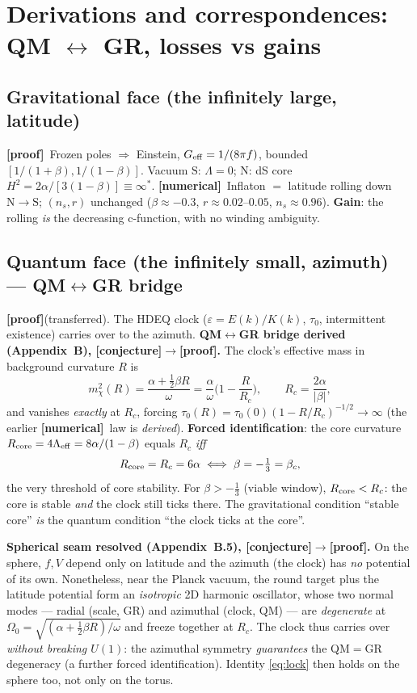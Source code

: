 \documentclass[11pt]{article}
\newcommand{\preuve}{{\small\textbf{[proof]}}}
\newcommand{\num}{{\small\textbf{[numerical]}}}
\newcommand{\conj}{{\small\textbf{[conjecture]}}}
\newcommand{\Spole}{\mathrm{S}}
\newcommand{\Npole}{\mathrm{N}}
\theoremstyle{definition}
\begin{document}
\section{Derivations and correspondences: QM $\leftrightarrow$ GR, losses vs gains}

\subsection{Gravitational face (the infinitely large, latitude)}
\preuve\ Frozen poles $\Rightarrow$ Einstein, $G_{\rm eff}=1/(8\pi f)$, bounded
$[1/(1+\beta),1/(1-\beta)]$. Vacuum $\Spole$: $\Lambda=0$; $\Npole$: dS core
$H^2=2\alpha/[3(1-\beta)]\equiv\infty^\ast$. \num\ Inflaton $=$ latitude rolling down $\Npole\!\to\!\Spole$;
$(n_s,r)$ unchanged ($\beta\approx-0.3$, $r\approx0.02$--$0.05$, $n_s\approx0.96$). \textbf{Gain}:
the rolling \emph{is} the decreasing c-function, with no winding ambiguity.

\subsection{Quantum face (the infinitely small, azimuth) --- QM$\leftrightarrow$GR bridge}\label{sec:QM}
\preuve(transferred). The HDEQ clock ($\varepsilon=E(k)/K(k)$, $\tau_0$, intermittent existence) carries
over to the azimuth. \textbf{QM$\leftrightarrow$GR bridge derived (Appendix~B), \conj$\to$\preuve.} The
clock's effective mass in background curvature $R$ is
\begin{equation}\label{eq:mass}
m_\chi^2(R)=\frac{\alpha+\tfrac12\beta R}{\omega}=\frac{\alpha}{\omega}\Big(1-\frac{R}{R_c}\Big),
\qquad R_c=\frac{2\alpha}{|\beta|},
\end{equation}
and vanishes \emph{exactly} at $R_c$, forcing $\tau_0(R)=\tau_0(0)(1-R/R_c)^{-1/2}\to\infty$ (the earlier
\num\ law is \emph{derived}). \textbf{Forced identification}: the core curvature
$R_{\rm core}=4\Lambda_{\rm eff}=8\alpha/(1-\beta)$ equals $R_c$ \emph{iff}
\begin{equation}\label{eq:lock}
R_{\rm core}=R_c=6\alpha\iff\beta=-\tfrac13=\beta_c,
\end{equation}
the very threshold of core stability. For $\beta>-\tfrac13$ (viable window), $R_{\rm core}<R_c$:
the core is stable \emph{and} the clock still ticks there. The gravitational condition ``stable core''
\emph{is} the quantum condition ``the clock ticks at the core''.

\textbf{Spherical seam resolved (Appendix~B.5), \conj$\to$\preuve.} On the sphere, $f,V$ depend only on
latitude and the azimuth (the clock) has \emph{no} potential of its own. Nonetheless, near the Planck
vacuum, the round target plus the latitude potential form an \emph{isotropic} 2D harmonic oscillator,
whose two normal modes --- radial (scale, GR) and azimuthal (clock, QM) --- are \emph{degenerate} at
$\Omega_0=\sqrt{(\alpha+\tfrac12\beta R)/\omega}$ and freeze together at $R_c$. The clock thus carries over
\emph{without breaking $U(1)$}: the azimuthal symmetry \emph{guarantees} the QM$=$GR degeneracy (a further
forced identification). Identity \eqref{eq:lock} then holds on the sphere too, not only on the torus.
\end{document}
